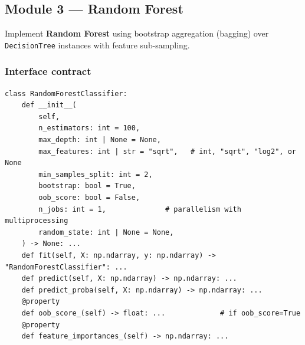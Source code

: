 \documentclass[11pt,a4paper]{article}
\begin{document}
\subsection{Module 3 --- Random Forest}
Implement \textbf{Random Forest} using bootstrap aggregation (bagging) over \texttt{DecisionTree} instances with feature sub-sampling.
\subsubsection{Interface contract}
\begin{lstlisting}[style=python]
class RandomForestClassifier:
    def __init__(
        self,
        n_estimators: int = 100,
        max_depth: int | None = None,
        max_features: int | str = "sqrt",   # int, "sqrt", "log2", or None
        min_samples_split: int = 2,
        bootstrap: bool = True,
        oob_score: bool = False,
        n_jobs: int = 1,              # parallelism with multiprocessing
        random_state: int | None = None,
    ) -> None: ...
    def fit(self, X: np.ndarray, y: np.ndarray) -> "RandomForestClassifier": ...
    def predict(self, X: np.ndarray) -> np.ndarray: ...
    def predict_proba(self, X: np.ndarray) -> np.ndarray: ...
    @property
    def oob_score_(self) -> float: ...             # if oob_score=True
    @property
    def feature_importances_(self) -> np.ndarray: ...
\end{lstlisting}
\end{document}
